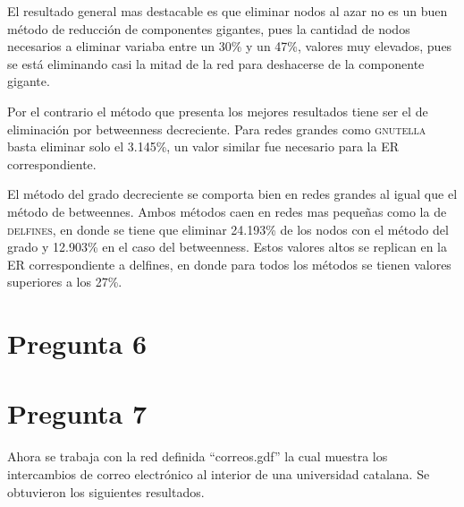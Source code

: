 \documentclass[letterpaper]{article}
\begin{document}
El resultado general mas destacable es que eliminar nodos al azar no es un buen método de reducción de componentes gigantes, pues la cantidad de nodos necesarios a eliminar variaba entre un 30\% y un 47\%, valores muy elevados, pues se está eliminando casi la mitad de la red para deshacerse de la componente gigante.

Por el contrario el método que presenta los mejores resultados tiene ser el de eliminación por betweenness decreciente. Para redes grandes como \textsc{gnutella} basta eliminar solo el 3.145\%, un valor similar fue necesario para la ER correspondiente.

El método del grado decreciente se comporta bien en redes grandes al igual que el método de betweennes. Ambos métodos caen en redes mas pequeñas como la de \textsc{delfines}, en donde se tiene que eliminar 24.193\% de los nodos con el método del grado y 12.903\% en el caso del betweenness. Estos valores altos se replican en la ER correspondiente a delfines, en donde para todos los métodos se tienen valores superiores a los 27\%.

\section{Pregunta 6}
\section{Pregunta 7}
Ahora se trabaja con la red definida ``correos.gdf'' la cual muestra los intercambios de correo electrónico al interior de una universidad catalana. Se obtuvieron los siguientes resultados.
\end{document}
